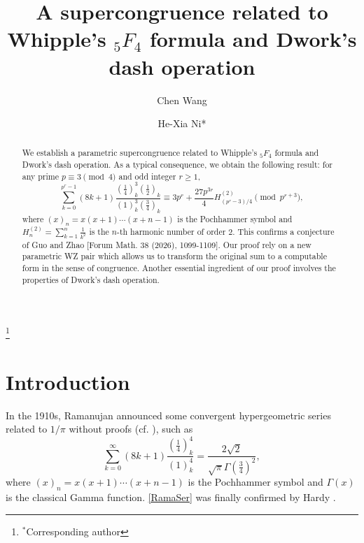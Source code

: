 \documentclass[12pt,reqno]{amsart}
\def\f{\frac}
\theoremstyle{plain}
\theoremstyle{definition}
\theoremstyle{remark}
\numberwithin{equation}{section}
\begin{document}
\title[A supercongruence related to Whipple's ${}_5F_4$ formula]{A supercongruence related to Whipple's ${}_5F_4$ formula and Dwork's dash operation}


\author[Chen Wang]{Chen Wang}
\address{(Chen Wang) Department of Applied Mathematics, Nanjing Forestry University, Nanjing 210037, People's Republic of China}

\author[He-Xia Ni]{He-Xia Ni*}
\address{(He-Xia Ni) Department of Applied Mathematics, Nanjing Audit University, Nanjing 211815, People's Republic of China}

\begin{abstract}
We establish a parametric supercongruence related to Whipple's ${}_5F_4$ formula and Dwork's dash operation. As a typical consequence, we obtain the following result: for any prime $p\equiv3\pmod4$ and odd integer $r\geq1$,
$$
\sum_{k=0}^{p^r-1}(8k+1)\frac{(\frac14)_k^3(\frac12)_k}{(1)_k^3(\frac34)_k}\equiv 3p^r+\frac{27p^{3r}}{4}H_{(p^r-3)/4}^{(2)}\pmod{p^{r+3}},
$$
where $(x)_n=x(x+1)\cdots(x+n-1)$ is the Pochhammer symbol and $H_n^{(2)}=\sum_{k=1}^n\f{1}{k^2}$ is the $n$-th harmonic number of order $2$. This confirms a conjecture of Guo and Zhao [Forum Math. 38 (2026), 1099-1109]. Our proof rely on a new parametric WZ pair which allows us to transform the original sum to a computable form in the sense of congruence. Another essential ingredient of our proof involves the properties of Dwork's dash operation.
\end{abstract}

\thanks{$^{\ast}$Corresponding author}

\maketitle

\section{Introduction}

In the 1910s, Ramanujan announced some convergent hypergeometric series related to $1/\pi$ without proofs (cf. \cite{Berndt1994}), such as
\begin{equation}\label{RamaSer}
\sum_{k=0}^{\infty}(8k+1)\f{(\f14)_k^4}{(1)_k^4}=\f{2\sqrt2}{\sqrt{\pi}\Gamma(\f34)^2},
\end{equation}
where $(x)_n=x(x+1)\cdots(x+n-1)$ is the Pochhammer symbol and $\Gamma(x)$ is the classical Gamma function. \eqref{RamaSer} was finally confirmed by Hardy \cite{Hardy1923}.
\end{document}
